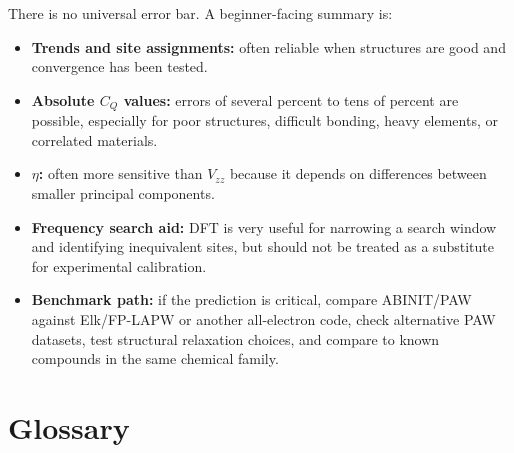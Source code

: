 \documentclass[11pt]{article}
\newcommand{\CQ}{C_Q}
\newcommand{\Vzz}{V_{zz}}
\newcommand{\etaEFG}{\eta}
\begin{document}
There is no universal error bar.  A beginner-facing summary is:
\begin{itemize}
\item \textbf{Trends and site assignments:} often reliable when structures are good and convergence has been tested.
\item \textbf{Absolute $\CQ$ values:} errors of several percent to tens of percent are possible, especially for poor structures, difficult bonding, heavy elements, or correlated materials.
\item \textbf{$\etaEFG$:} often more sensitive than $\Vzz$ because it depends on differences between smaller principal components.
\item \textbf{Frequency search aid:} DFT is very useful for narrowing a search window and identifying inequivalent sites, but should not be treated as a substitute for experimental calibration.
\item \textbf{Benchmark path:} if the prediction is critical, compare ABINIT/PAW against Elk/FP-LAPW or another all-electron code, check alternative PAW datasets, test structural relaxation choices, and compare to known compounds in the same chemical family.
\end{itemize}

\section{Glossary}
\end{document}
